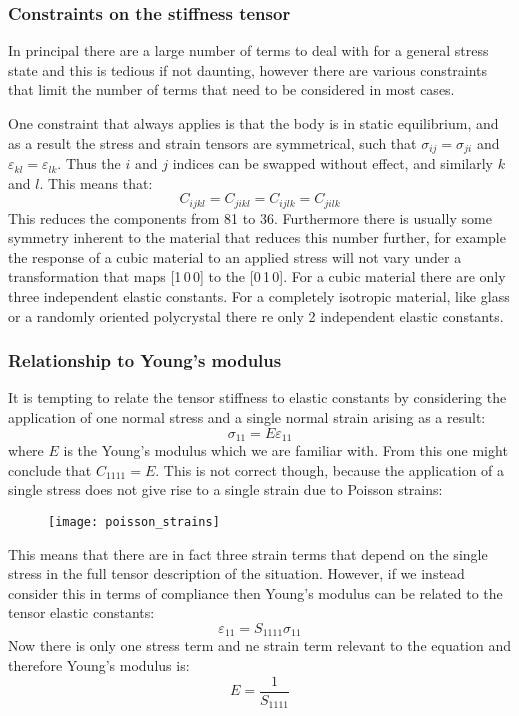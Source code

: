\subsubsection{Constraints on the stiffness tensor}

In principal there are a large number of terms to deal with for a general stress state and this is tedious if not daunting, however there are various constraints that limit the number of terms that need to be considered in most cases.

One constraint that always applies is that the body is in static equilibrium, and as a result the stress and strain tensors are symmetrical, such that $\sigma_{ij}=\sigma_{ji}$ and $\varepsilon_{kl}=\varepsilon_{lk}$. Thus the $i$ and $j$ indices can be swapped without effect, and similarly $k$ and $l$. This means that:
\begin{equation}
C_{ijkl}=C_{jikl}=C_{ijlk}=C_{jilk}
\end{equation}
This reduces the components from 81 to 36. Furthermore there is usually some symmetry inherent to the material that reduces this number further, for example the response of a cubic material to an applied stress will not vary under a transformation that maps [1\,0\,0] to the [0\,1\,0]. For a cubic material there are only three independent elastic constants. For a completely isotropic material, like glass or a randomly oriented polycrystal there re only 2 independent elastic constants.

\subsubsection{Relationship to Young's modulus}

It is tempting to relate the tensor stiffness to elastic constants by considering  the application of one normal stress and a single normal strain arising as a result:
\begin{equation}
\sigma_{11} = E \varepsilon_{11}
\end{equation}
where $E$ is the Young's modulus which we are familiar with. From this one might conclude that $C_{1111}=E$. This is not correct though, because the application of a single stress does not give rise to a single strain due to Poisson strains:
\FloatBarrier
\begin{figure}[h!]
\centering
\texttt{[image: poisson\_strains]}
\end{figure}
\FloatBarrier

This means that there are in fact three strain terms that depend on the single stress in the full tensor description of the situation. However, if we instead consider this in terms of compliance then Young's modulus can be related to the tensor elastic constants:
\begin{equation}
\varepsilon_{11} = S_{1111}\sigma_{11}
\end{equation}
Now there is only one stress term and ne strain term relevant to the equation and therefore Young's modulus is:
\begin{equation}
E = \frac{1}{S_{1111}}
\end{equation}

